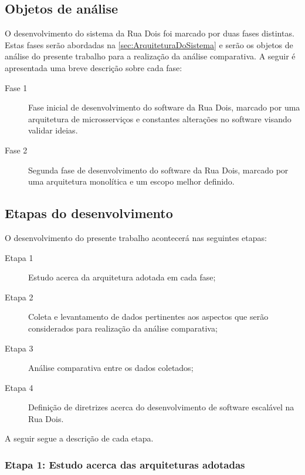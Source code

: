 \subsection{Objetos de análise}

O desenvolvimento do sistema da Rua Dois foi marcado por duas fases distintas.
Estas fases serão abordadas na \autoref{sec:ArquiteturaDoSistema} e serão
os objetos de análise do presente trabalho para a realização da análise
comparativa. A seguir é apresentada uma breve descrição sobre cada fase:

    \begin{description}
        \item [Fase 1] Fase inicial de desenvolvimento do software da Rua Dois,
        marcado por uma arquitetura de microsserviços e constantes alterações
        no software visando validar ideias.
        \item [Fase 2] Segunda fase de desenvolvimento do software da Rua Dois,
        marcado por uma arquitetura monolítica e um escopo melhor definido.
    \end{description}

\subsection{Etapas do desenvolvimento}

O desenvolvimento do presente trabalho acontecerá nas seguintes etapas:

    \begin{description}
        \item[Etapa 1] Estudo acerca da arquitetura adotada em cada fase;
        \item[Etapa 2] Coleta e levantamento de dados pertinentes aos aspectos que serão
        considerados para realização da análise comparativa;
        \item[Etapa 3] Análise comparativa entre os dados coletados;
        \item[Etapa 4] Definição de diretrizes acerca do desenvolvimento de software
        escalável na Rua Dois.
    \end{description}

A seguir segue a descrição de cada etapa.

\subsubsection{Etapa 1: Estudo acerca das arquiteturas adotadas}

